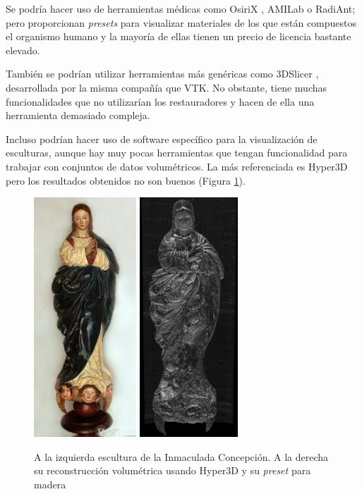 Se podría hacer uso de herramientas médicas como OsiriX \cite{osirix}, AMILab \cite{amilab} o RadiAnt; pero proporcionan \textit{presets} para visualizar materiales de los que están compuestos el organismo humano y la mayoría de ellas tienen un precio de licencia bastante elevado.

También se podrían utilizar herramientas más genéricas como 3DSlicer \cite{slicer}, desarrollada por la misma compañía que VTK. No obstante, tiene muchas funcionalidades que no utilizarían los restauradores y hacen de ella una herramienta demasiado compleja.

Incluso podrían hacer uso de software específico para la visualización de esculturas, aunque hay muy pocas herramientas que tengan funcionalidad para trabajar con conjuntos de datos volumétricos. La más referenciada es Hyper3D \cite{hyper3d} pero los resultados obtenidos no son buenos (Figura \ref{fig:hyper3d_results}).

\begin{figure}[H]
	\centering
	\includegraphics[height=9cm]{imagenes/inmaculada_concepcion_real}
	\includegraphics[height=9cm]{imagenes/inmaculada_concepcion_hyper3d}
	\caption{A la izquierda escultura de la Inmaculada Concepción. A la derecha su reconstrucción volumétrica usando Hyper3D y su \textit{preset} para madera}
	\label{fig:hyper3d_results}
\end{figure}

